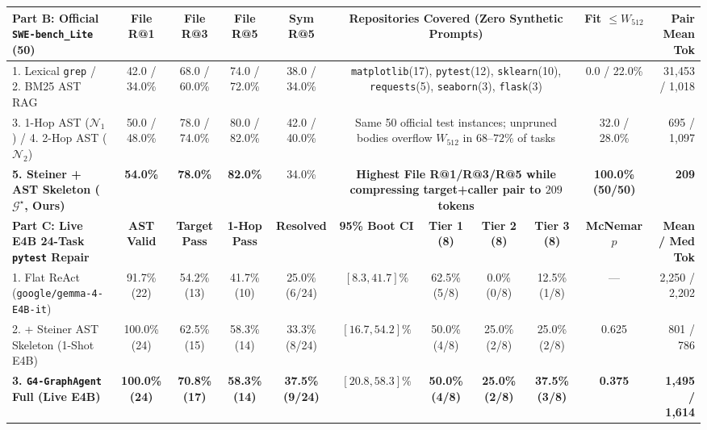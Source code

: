 \documentclass[10pt,twocolumn,letterpaper]{article}
\begin{document}
\begin{table}[t]
{\begin{tabular}{lcccccccccr}
\midrule
\textbf{Part B: Official \texttt{SWE-bench\_Lite} (50)} & \textbf{File R@1} & \textbf{File R@3} & \textbf{File R@5} & \textbf{Sym R@5} & \multicolumn{4}{c}{\textbf{Repositories Covered (Zero Synthetic Prompts)}} & \textbf{Fit $\le W_{512}$} & \textbf{Pair Mean Tok} \\
\midrule
1. Lexical \texttt{grep} / 2. BM25 AST RAG & 42.0 / 34.0\% & 68.0 / 60.0\% & 74.0 / 72.0\% & 38.0 / 34.0\% & \multicolumn{4}{c}{\texttt{matplotlib}(17), \texttt{pytest}(12), \texttt{sklearn}(10), \texttt{requests}(5), \texttt{seaborn}(3), \texttt{flask}(3)} & 0.0 / 22.0\% & 31,453 / 1,018 \\
3. 1-Hop AST ($\mathcal{N}_1$) / 4. 2-Hop AST ($\mathcal{N}_2$) & 50.0 / 48.0\% & 78.0 / 74.0\% & 80.0 / 82.0\% & 42.0 / 40.0\% & \multicolumn{4}{c}{Same 50 official test instances; unpruned bodies overflow $W_{512}$ in $68\text{--}72\%$ of tasks} & 32.0 / 28.0\% & 695 / 1,097 \\
\rowcolor{softblue}
\textbf{5. Steiner + AST Skeleton ($\mathcal{G}^\star$, Ours)} & \textbf{54.0\%} & \textbf{78.0\%} & \textbf{82.0\%} & 34.0\% & \multicolumn{4}{c}{\textbf{Highest File R@1/R@3/R@5 while compressing target+caller pair to $209$ tokens}} & \textbf{100.0\% (50/50)} & \textbf{209} \\
\midrule
\textbf{Part C: Live E4B 24-Task \texttt{pytest} Repair} & \textbf{AST Valid} & \textbf{Target Pass} & \textbf{1-Hop Pass} & \textbf{Resolved} & \textbf{95\% Boot CI} & \textbf{Tier 1 (8)} & \textbf{Tier 2 (8)} & \textbf{Tier 3 (8)} & \textbf{McNemar $p$} & \textbf{Mean / Med Tok} \\
\midrule
1. Flat ReAct (\texttt{google/gemma-4-E4B-it}) & 91.7\% (22) & 54.2\% (13) & 41.7\% (10) & 25.0\% (6/24) & $[8.3, 41.7]\%$ & 62.5\% (5/8) & 0.0\% (0/8) & 12.5\% (1/8) & --- & 2,250 / 2,202 \\
2. + Steiner AST Skeleton (1-Shot E4B) & 100.0\% (24) & 62.5\% (15) & 58.3\% (14) & 33.3\% (8/24) & $[16.7, 54.2]\%$ & 50.0\% (4/8) & 25.0\% (2/8) & 25.0\% (2/8) & 0.625 & 801 / 786 \\
\rowcolor{softblue}
\textbf{3. \texttt{G4-GraphAgent} Full (Live E4B)} & \textbf{100.0\% (24)} & \textbf{70.8\% (17)} & \textbf{58.3\% (14)} & \textbf{37.5\% (9/24)} & \textbf{$[20.8, 58.3]\%$} & \textbf{50.0\% (4/8)} & \textbf{25.0\% (2/8)} & \textbf{37.5\% (3/8)} & \textbf{0.375} & \textbf{1,495 / 1,614} \\
\bottomrule
\end{tabular}%
}
\end{table}
\end{document}
